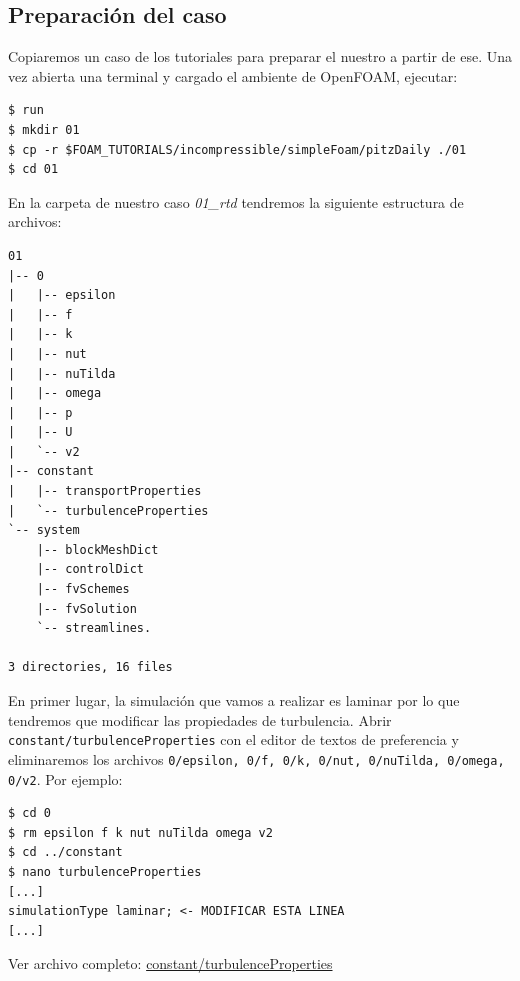 \documentclass{article}
\begin{document}
\subsection{Preparación del caso}
Copiaremos un caso de los tutoriales para preparar el nuestro a partir de ese. Una vez abierta una terminal y 
cargado el ambiente de OpenFOAM, ejecutar:
\begin{lstlisting}
$ run
$ mkdir 01
$ cp -r $FOAM_TUTORIALS/incompressible/simpleFoam/pitzDaily ./01
$ cd 01
\end{lstlisting}

En la carpeta de nuestro caso \textit{01\_rtd} tendremos
la siguiente estructura de archivos:\par

\begin{lstlisting}
01
|-- 0
|   |-- epsilon
|   |-- f
|   |-- k
|   |-- nut
|   |-- nuTilda
|   |-- omega
|   |-- p
|   |-- U
|   `-- v2
|-- constant
|   |-- transportProperties
|   `-- turbulenceProperties
`-- system
    |-- blockMeshDict
    |-- controlDict
    |-- fvSchemes
    |-- fvSolution
    `-- streamlines.

3 directories, 16 files
\end{lstlisting}


En primer lugar, la simulación que vamos a realizar es laminar por lo que tendremos que modificar las propiedades de turbulencia. Abrir\\ \texttt{constant/turbulenceProperties} con el editor de textos de preferencia y eliminaremos los archivos \texttt{0/epsilon, 0/f, 0/k, 0/nut, 0/nuTilda, 0/omega, 0/v2}. Por ejemplo:\par
\begin{lstlisting}
$ cd 0
$ rm epsilon f k nut nuTilda omega v2
$ cd ../constant
$ nano turbulenceProperties
[...]
simulationType laminar; <- MODIFICAR ESTA LINEA
[...]
\end{lstlisting}

\noindent Ver archivo completo: \href{https://github.com/guillerolle/adscripcion_cfd/blob/master/01/constant/turbulenceProperties}{constant/turbulenceProperties}
%
\end{document}
